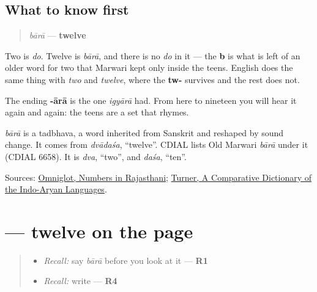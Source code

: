 \subsection*{What to know first}
\begin{quote}
\emph{bārā} — \textbf{twelve}
\end{quote}

Two is \emph{do}. Twelve is \emph{bārā}, and there is no \emph{do} in it — the \textbf{b} is what is left of an older word for two that Marwari kept only inside the teens. English does the same thing with \emph{two} and \emph{twelve}, where the \textbf{tw-} survives and the rest does not.

The ending \textbf{-ārā} is the one \emph{igyārā} had. From here to nineteen you will hear it again and again: the teens are a set that rhymes.

\begin{cousinweb}
\emph{bārā} is a tadbhava, a word inherited from Sanskrit and reshaped by sound change. It comes from \emph{dvādaśa}, \textquotedblleft{}twelve\textquotedblright{}. CDIAL lists Old Marwari \emph{bārā} under it (CDIAL 6658). It is \emph{dva}, \textquotedblleft{}two\textquotedblright{}, and \emph{daśa}, \textquotedblleft{}ten\textquotedblright{}.
\end{cousinweb}

\begin{tcolorbox}[breakable,colback=teal!4,colframe=teal!35!black,title={Before you move on}]
Sources: \href{https://www.omniglot.com/language/numbers/rajasthani.htm}{Omniglot, Numbers in Rajasthani}; \href{https://dsal.uchicago.edu/dictionaries/soas/}{Turner, A Comparative Dictionary of the Indo-Aryan Languages}.
\end{tcolorbox}
\section[\texorpdfstring{\mw{बारा} (bārā)}{बारा (bārā)}]{ — twelve on the page}

\label{lesson:MW-C37-baara}



\begin{quote}
\begin{itemize}
\raggedright
  \item \emph{Recall:} say \emph{bārā} before you look at it — \textbf{R1}
  \item \emph{Recall:} write \textbf{} — \textbf{R4}
\end{itemize}
\end{quote}

